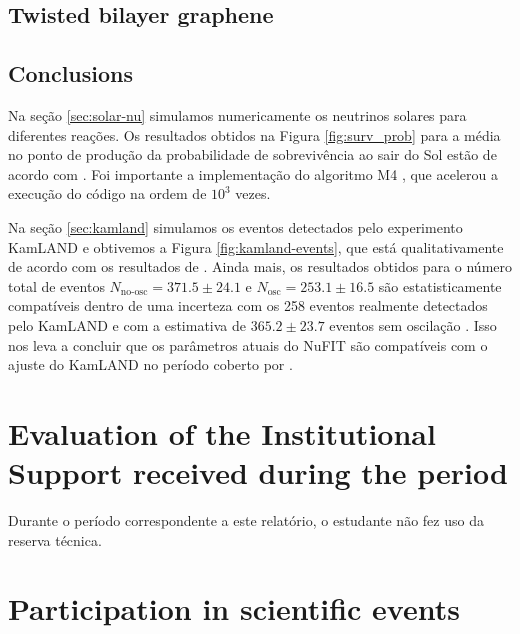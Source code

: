 \documentclass[12pt]{report}
\begin{document}
\section{Twisted bilayer graphene}





\section{Conclusions}

Na seção \ref{sec:solar-nu} simulamos numericamente os neutrinos solares para diferentes reações. Os resultados obtidos na Figura \ref{fig:surv_prob} para a média no ponto de produção da probabilidade de sobrevivência ao sair do Sol estão de acordo com \cite{winslow}. Foi importante a implementação do algoritmo M4 \cite{efficient-nu}, que acelerou a execução do código na ordem de $10^3$ vezes.


Na seção \ref{sec:kamland} simulamos os eventos detectados pelo experimento KamLAND e obtivemos a Figura \ref{fig:kamland-events}, que está qualitativamente de acordo com os resultados de \cite{spectral-distortion}. Ainda mais, os resultados obtidos para o número total de eventos $N_{\text{no-osc}} = 371.5 \pm 24.1$ e $N_{\text{osc}} = 253.1 \pm 16.5$ são estatisticamente compatíveis dentro de uma incerteza com os 258 eventos realmente detectados pelo KamLAND e com a estimativa de $365.2 \pm 23.7$ eventos sem oscilação \cite{spectral-distortion}. Isso nos leva a concluir que os parâmetros atuais do NuFIT \cite{nufit} são compatíveis com o ajuste do KamLAND no período coberto por \cite{spectral-distortion}.



\chapter{Evaluation of the Institutional Support received during the period} \label{chp:apoioInst}

Durante o período correspondente a este relatório, o estudante não fez uso da reserva técnica.



\chapter{Participation in scientific events} \label{chp:particEvento}
\end{document}
